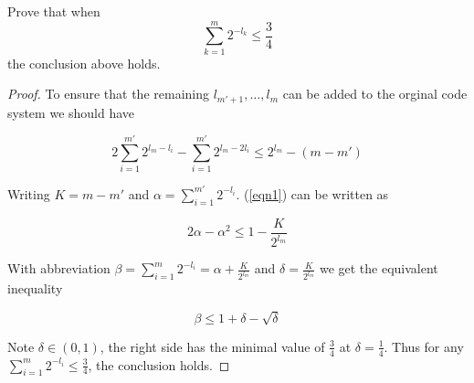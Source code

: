 \begin{exercise}{ Prove that when
  $$\sum_{k=1}^{m} 2^{-l_{k}} \leq \frac{3}{4}$$  the conclusion above holds.}
\begin{proof}
    To ensure that the remaining $l_{m'+1},\ldots,l_m$ can be added to the orginal code system we should have

    \begin{equation}
      2 \sum_{i=1}^{m'} 2^{l_m -l_i}- \sum_{i=1}^{m'}2^{l_m - 2l_i} \le 2^{l_m} - (m -m')
      \label{eqn1}
    \end{equation}

    Writing $K = m - m'$ and $\alpha = \sum_{i=1}^{m'} 2^{-l_i}$. (\ref{eqn1}) can be written as

    \begin{equation}
      2\alpha - \alpha^2 \le 1 - \frac{K}{2^{l_m}}
    \end{equation}

    With abbreviation $\beta = \sum_{i=1}^{m} 2^{-l_i} = \alpha + \frac{K}{2^{l_m}}$ and $\delta = \frac{K}{2^{l_m}}$ we get the equivalent inequality

    \begin{equation}
      \beta \le 1+\delta - \sqrt{\delta}
    \end{equation}

    Note $\delta \in (0,1)$, the right side has the minimal value of $\frac{3}{4}$ at $\delta = \frac{1}{4}$. Thus for any $ \sum_{i=1}^{m} 2^{-l_i} \le \frac{3}{4}$, the conclusion holds.

  \end{proof}
  \label{ex5-3}
\end{exercise}


